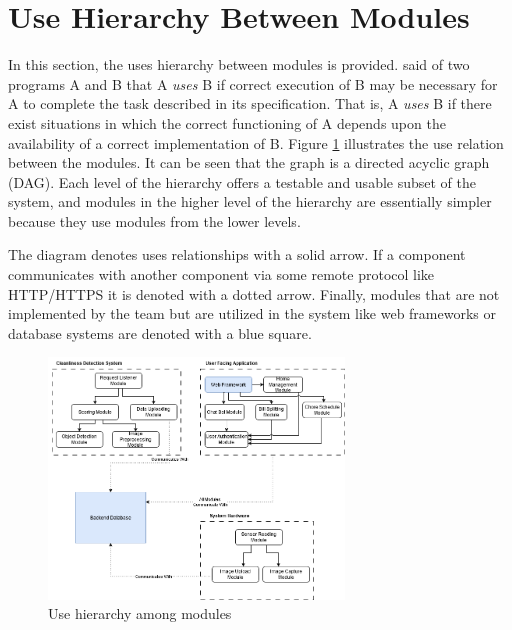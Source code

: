 \documentclass[12pt, titlepage]{article}
\begin{document}
\section{Use Hierarchy Between Modules} \label{SecUse}

In this section, the uses hierarchy between modules is
provided. \citet{Parnas1978} said of two programs A and B that A {\em uses} B if
correct execution of B may be necessary for A to complete the task described in
its specification. That is, A {\em uses} B if there exist situations in which
the correct functioning of A depends upon the availability of a correct
implementation of B.  Figure \ref{FigUH} illustrates the use relation between
the modules. It can be seen that the graph is a directed acyclic graph
(DAG). Each level of the hierarchy offers a testable and usable subset of the
system, and modules in the higher level of the hierarchy are essentially simpler
because they use modules from the lower levels.


The diagram denotes uses relationships with a solid arrow. If a component  communicates with another component via some remote protocol like HTTP/HTTPS it is denoted with a dotted arrow. Finally, modules that are not implemented by the team but are utilized in the system like web frameworks or database systems are denoted with a blue square.


\begin{figure}[H]
\centering
\includegraphics[width=0.7\textwidth]{UsesHierarchy.png}
\caption{Use hierarchy among modules}
\label{FigUH}
\end{figure}
\end{document}
